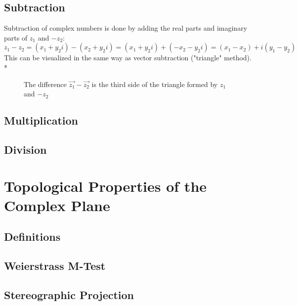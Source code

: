 \documentclass[]{article}
\begin{document}
    \subsection{Subtraction}
        \noindent Subtraction of complex numbers is done by adding the real parts and imaginary parts of $z_1$ and $-z_2$: $z_1 - z_2 = (x_1+y_2i)-(x_2+y_2i) = (x_1+y_2i)+(-x_2-y_2i)=(x_1-x_2)+i(y_1-y_2)$ This can be visualized in the same way as vector subtraction ("triangle" method). \\*  
        \begin{figure}[!h]
    	    \centering
    	    \caption{The difference $\vec{z_1}-\vec{z_2}$ is the third side of the triangle formed by $z_1$ and $-z_2$}
    \end{figure}
    \subsection{Multiplication}
    \subsection{Division}
        
\section{Topological Properties of the Complex Plane}
    \subsection{Definitions}
    \subsection{Weierstrass M-Test}
    \subsection{Stereographic Projection}
\end{document}
